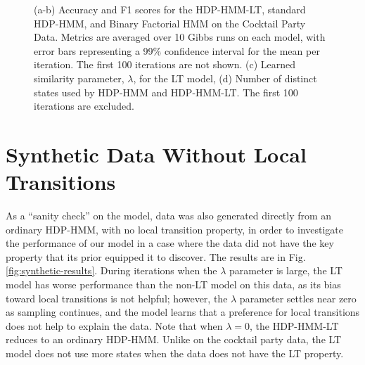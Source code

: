 \begin{figure}[tb]
\begin{minipage}{0.40\textwidth}
\end{minipage}
\caption{(a-b) Accuracy and F1 scores for the HDP-HMM-LT, standard HDP-HMM, and
    Binary Factorial HMM on
    the Cocktail Party Data.  Metrics are averaged
  over 10 Gibbs runs on each model, with error bars representing a 99\% confidence
  interval for the mean per iteration.  The first 100 iterations are
  not shown. (c) Learned similarity parameter, $\lambda$, for the LT
  model, (d) Number of distinct states used by HDP-HMM and
  HDP-HMM-LT.  The first 100 iterations are excluded.}
  \label{fig:cocktail-results}
\end{figure}

\section{Synthetic Data Without Local Transitions}
\label{sec:synth-data-without}

As a ``sanity check'' on the model, data was also generated 
directly from an ordinary HDP-HMM, with no local
transition property, in order to investigate the performance of our
model in a case where the data did not have the key property that its
prior equipped it to discover.  The results are in
Fig. \ref{fig:synthetic-results}.
During iterations when the $\lambda$ parameter is large, the LT model has worse
performance than the non-LT model on this data, as its bias toward
local transitions is not helpful; however, the
$\lambda$ parameter settles near zero as sampling continues, and the 
model learns that a preference for local transitions does not help to explain
the data.  Note that when $\lambda = 0$, the HDP-HMM-LT reduces to an ordinary HDP-HMM.
Unlike on the cocktail party data, the LT model does not use more
states when the data does not have the LT property.

